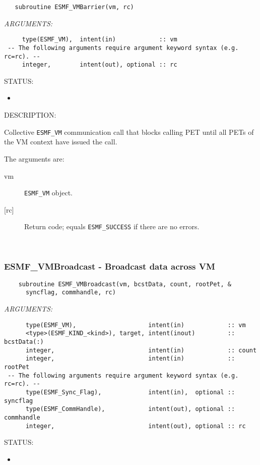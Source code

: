  
\begin{verbatim}   subroutine ESMF_VMBarrier(vm, rc)\end{verbatim}{\em ARGUMENTS:}
\begin{verbatim}     type(ESMF_VM),  intent(in)            :: vm
 -- The following arguments require argument keyword syntax (e.g. rc=rc). --
     integer,        intent(out), optional :: rc           \end{verbatim}
{\sf STATUS:}
   \begin{itemize}
   \item{}
   \end{itemize}
  
{\sf DESCRIPTION:\\ }


     Collective {\tt ESMF\_VM} communication call that blocks calling PET until
     all PETs of the VM context have issued the call.
  
     The arguments are:
     \begin{description}
     \item[vm] 
          {\tt ESMF\_VM} object.
     \item[{[rc]}] 
          Return code; equals {\tt ESMF\_SUCCESS} if there are no errors.
     \end{description}
   
 
\mbox{}\hrulefill\ 
 
\subsubsection [ESMF\_VMBroadcast] {ESMF\_VMBroadcast - Broadcast data across VM}


  
\begin{verbatim}    subroutine ESMF_VMBroadcast(vm, bcstData, count, rootPet, &
      syncflag, commhandle, rc)\end{verbatim}{\em ARGUMENTS:}
\begin{verbatim}      type(ESMF_VM),                    intent(in)            :: vm
      <type>(ESMF_KIND_<kind>), target, intent(inout)         :: bcstData(:)
      integer,                          intent(in)            :: count
      integer,                          intent(in)            :: rootPet
 -- The following arguments require argument keyword syntax (e.g. rc=rc). --
      type(ESMF_Sync_Flag),             intent(in),  optional :: syncflag
      type(ESMF_CommHandle),            intent(out), optional :: commhandle
      integer,                          intent(out), optional :: rc\end{verbatim}
{\sf STATUS:}
   \begin{itemize}
   \item{}
   \end{itemize}
  
